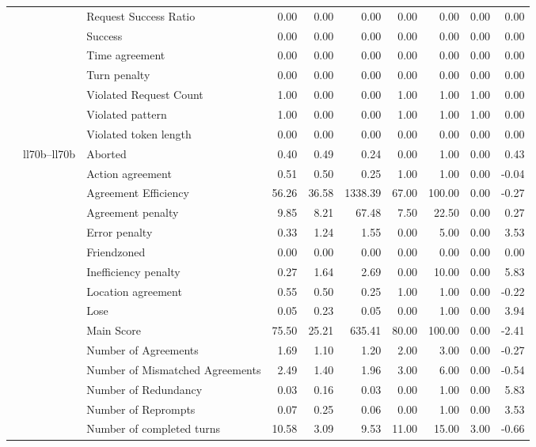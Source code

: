 \begin{tabular}{lllrrrrrrr}
 &  & Request Success Ratio & 0.00 & 0.00 & 0.00 & 0.00 & 0.00 & 0.00 & 0.00 \\
 &  & Success & 0.00 & 0.00 & 0.00 & 0.00 & 0.00 & 0.00 & 0.00 \\
 &  & Time agreement & 0.00 & 0.00 & 0.00 & 0.00 & 0.00 & 0.00 & 0.00 \\
 &  & Turn penalty & 0.00 & 0.00 & 0.00 & 0.00 & 0.00 & 0.00 & 0.00 \\
 &  & Violated Request Count & 1.00 & 0.00 & 0.00 & 1.00 & 1.00 & 1.00 & 0.00 \\
 &  & Violated pattern & 1.00 & 0.00 & 0.00 & 1.00 & 1.00 & 1.00 & 0.00 \\
 &  & Violated token length & 0.00 & 0.00 & 0.00 & 0.00 & 0.00 & 0.00 & 0.00 \\
\cline{2-10}
 & \multirow[t]{27}{*}{ll70b--ll70b} & Aborted & 0.40 & 0.49 & 0.24 & 0.00 & 1.00 & 0.00 & 0.43 \\
 &  & Action agreement & 0.51 & 0.50 & 0.25 & 1.00 & 1.00 & 0.00 & -0.04 \\
 &  & Agreement Efficiency & 56.26 & 36.58 & 1338.39 & 67.00 & 100.00 & 0.00 & -0.27 \\
 &  & Agreement penalty & 9.85 & 8.21 & 67.48 & 7.50 & 22.50 & 0.00 & 0.27 \\
 &  & Error penalty & 0.33 & 1.24 & 1.55 & 0.00 & 5.00 & 0.00 & 3.53 \\
 &  & Friendzoned & 0.00 & 0.00 & 0.00 & 0.00 & 0.00 & 0.00 & 0.00 \\
 &  & Inefficiency penalty & 0.27 & 1.64 & 2.69 & 0.00 & 10.00 & 0.00 & 5.83 \\
 &  & Location agreement & 0.55 & 0.50 & 0.25 & 1.00 & 1.00 & 0.00 & -0.22 \\
 &  & Lose & 0.05 & 0.23 & 0.05 & 0.00 & 1.00 & 0.00 & 3.94 \\
 &  & Main Score & 75.50 & 25.21 & 635.41 & 80.00 & 100.00 & 0.00 & -2.41 \\
 &  & Number of Agreements & 1.69 & 1.10 & 1.20 & 2.00 & 3.00 & 0.00 & -0.27 \\
 &  & Number of Mismatched Agreements & 2.49 & 1.40 & 1.96 & 3.00 & 6.00 & 0.00 & -0.54 \\
 &  & Number of Redundancy & 0.03 & 0.16 & 0.03 & 0.00 & 1.00 & 0.00 & 5.83 \\
 &  & Number of Reprompts & 0.07 & 0.25 & 0.06 & 0.00 & 1.00 & 0.00 & 3.53 \\
 &  & Number of completed turns & 10.58 & 3.09 & 9.53 & 11.00 & 15.00 & 3.00 & -0.66 \\

\end{tabular}
